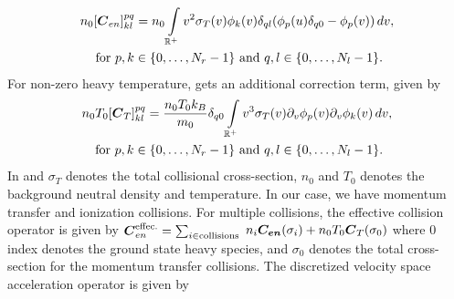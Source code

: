 \begin{multline}
    n_0 {[\vect C_{en}]}^{pq}_{kl} = n_0 \myint_{\reals^+} v^2 \sigma_T\of{v} \phi_{k}\of{v} \delta_{ql} \of{\phi_{p}\of{u} \delta_{q0}  -\phi_{p}\of{v}} \diff{v}, \\
    \text{ for } p,k \in \{0,\hdots, N_r-1\} \text{ and } q,l \in \{0, \hdots,  N_l-1\} \label{eq:c_en_mat_1d}.
\end{multline}
For non-zero heavy temperature,  gets an additional correction term, given by
\begin{multline}
	n_0 T_0 {[\vect C_{T}]}^{pq}_{kl} = \frac{n_0 T_0 k_B}{m_0} \delta_{q0} \myint_{\reals^+} v^3 \sigma_T\of{v} \partial_v \phi_p\of{v} \partial_v \phi_k\of{v} \diff{v}, \\
	\text{ for } p,k \in \{0,\hdots, N_r-1\} \text{ and } q,l \in \{0, \hdots,  N_l-1\} \label{eq:c_T0_mat_1d}.
\end{multline} In  and  $\sigma_T$ denotes the total collisional cross-section, $n_0$ and $T_0$ denotes the background neutral density and temperature. In our case, we have momentum transfer and ionization collisions. For multiple collisions, the effective collision operator is given by $\boldsymbol{C}_{en}^{\text{effec.}} = \sum_{i\in {\text{collisions}}}$ $n_i \vect{C_{en}} \of{\sigma_i} + n_0 T_0 \vect C_{T}\of{\sigma_0}$ where $0$ index denotes the ground state heavy species, and $\sigma_0$ denotes the total cross-section for the momentum transfer collisions. The discretized velocity space acceleration operator is given by
